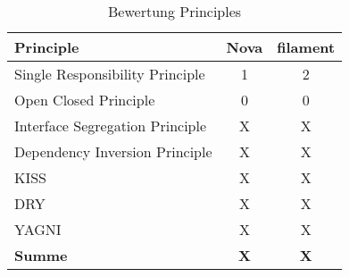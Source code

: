 \begin{table}[]
    \caption{Bewertung Principles}
    \label{tab:bewertung-principles}
    \centering
    \begin{tabular}{|l|c|c|}
        \hline
        \textbf{Principle}              & \textbf{Nova} & \textbf{filament} \\ \hline
        Single Responsibility Principle & 1             & 2                 \\ \hline
        Open Closed Principle           & 0             & 0                 \\ \hline
        Interface Segregation Principle & X             & X                 \\ \hline
        Dependency Inversion Principle  & X             & X                 \\ \hline
        KISS                            & X             & X                 \\ \hline
        DRY                             & X             & X                 \\ \hline
        YAGNI                           & X             & X                 \\ \hline
        \textbf{Summe}                  & \textbf{X}    & \textbf{X}        \\ \hline
    \end{tabular}
\end{table}

\color{black}
